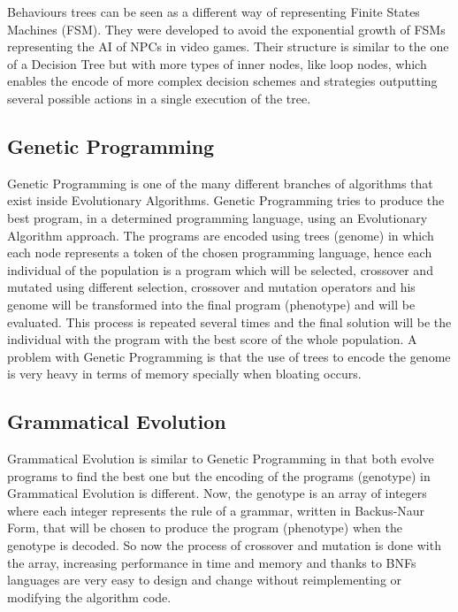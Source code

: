 \documentclass{llncs}
\begin{document}
Behaviours trees can be seen as a different way of representing Finite States Machines (FSM). They were developed to avoid the exponential growth of FSMs representing the AI of NPCs in video games. Their structure is similar to the one of a Decision Tree but with more types of inner nodes, like loop nodes, which enables the encode of more complex decision schemes and strategies outputting several possible actions in a single execution of the tree.
\subsection{Genetic Programming}
Genetic Programming is one of the many different branches of algorithms that exist inside Evolutionary Algorithms.
Genetic Programming tries to produce the best program, in a determined programming language, using an Evolutionary Algorithm approach. The programs are encoded using trees (genome)  in which each node represents a token of the chosen programming language, hence each individual of the population is a program which will be selected, crossover and mutated using different selection, crossover and mutation operators and his genome will be transformed into the final program (phenotype) and will be evaluated. This process is repeated several times and the final solution will be the individual with the program with the best score of the whole population. A problem with Genetic Programming is that the use of trees to encode the genome is very heavy in terms of memory specially when bloating occurs.  %
\subsection{Grammatical Evolution}
Grammatical Evolution is similar to Genetic Programming in that both evolve programs to find the best one but the encoding of the programs (genotype) in Grammatical Evolution is different. Now, the genotype is an array of integers where each integer represents the rule of a grammar, written in Backus-Naur Form,
that will be chosen to produce the program (phenotype) when the genotype is decoded. So now the process of crossover and mutation is done with the array, increasing performance in time and memory and thanks to BNFs languages are very easy to design and change without reimplementing or modifying the algorithm code.%
\end{document}
